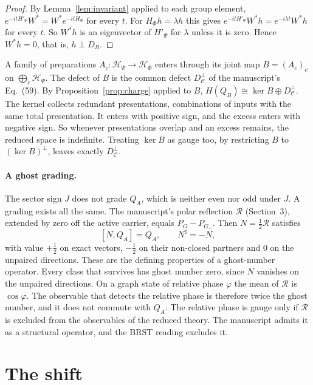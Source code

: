 \documentclass[11pt]{article}
\theoremstyle{remark}
\newcommand{\HP}{\mathcal H_\Psi}
\newcommand{\HF}{\mathcal H_\Phi}
\begin{document}
\begin{proof}
By Lemma~\ref{lem:invariant} applied to each group element, $e^{-itH'_\Psi}W^*=W^*e^{-itH_\Phi}$ for every $t$. For $H_\Phi h=\lambda h$ this gives $e^{-itH'_\Psi}W^*h=e^{-i\lambda t}W^*h$ for every $t$. So $W^*h$ is an eigenvector of $H'_\Psi$ for $\lambda$ unless it is zero. Hence $W^*h=0$, that is, $h\perp D_B$.
\end{proof}

A family of preparations $A_c:\HP\to\HF$ enters through its joint map $B=(A_c)_c$ on $\bigoplus_c\HP$. The defect of $B$ is the common defect $D_{\mathcal C}^\perp$ of the manuscript's Eq.~(59). By Proposition~\ref{prop:charge} applied to $B$, $H(Q_B)\cong\ker B\oplus D_{\mathcal C}^\perp$. The kernel collects redundant presentations, combinations of inputs with the same total presentation. It enters with positive sign, and the excess enters with negative sign. So whenever presentations overlap and an excess remains, the reduced space is indefinite. Treating $\ker B$ as gauge too, by restricting $B$ to $(\ker B)^\perp$, leaves exactly $D_{\mathcal C}^\perp$.

\paragraph{A ghost grading.} The sector sign $J$ does not grade $Q_A$, which is neither even nor odd under $J$. A grading exists all the same. The manuscript's polar reflection $\mathcal R$ (Section~3), extended by zero off the active carrier, equals $P_G-P_{G_-}$. Then $N=\tfrac12\mathcal R$ satisfies
\[
 [N,Q_A]=Q_A,\qquad N^\sharp=-N ,
\]
with value $+\tfrac12$ on exact vectors, $-\tfrac12$ on their non-closed partners and $0$ on the unpaired directions. These are the defining properties of a ghost-number operator. Every class that survives has ghost number zero, since $N$ vanishes on the unpaired directions. On a graph state of relative phase $\varphi$ the mean of $\mathcal R$ is $\cos\varphi$. The observable that detects the relative phase is therefore twice the ghost number, and it does not commute with $Q_A$. The relative phase is gauge only if $\mathcal R$ is excluded from the observables of the reduced theory. The manuscript admits it as a structural operator, and the BRST reading excludes it.

\section{The shift}
\label{sec:shift}
\end{document}
